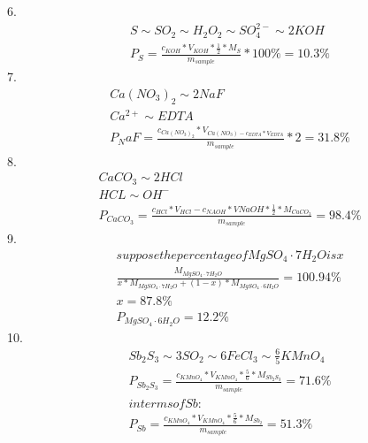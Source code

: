 \documentclass{article}
\begin{document}
6.\begin{equation}
    \begin{multlined}
        S \sim SO_2 \sim H_2O_2 \sim SO_4^{2-} \sim 2KOH\\
        P_S = \frac{c_{KOH}*V_{KOH}*\frac{1}{2}*M_S}{m_{sample}} * 100\% = 10.3\%
    \end{multlined}
\end{equation}
7.\begin{equation}
    \begin{multlined}
        Ca\left(NO_3\right)_2 \sim 2NaF\\
        Ca^{2+} \sim EDTA\\
        P_NaF = \frac{c_{Ca\left(NO_3\right)_2}*V_{Ca\left(NO_3\right) - c_{EDTA}*V_{EDTA}}}{m_{sample}} * 2 = 31.8\%
    \end{multlined}
\end{equation}
8.
\begin{equation}
    \begin{multlined}
        CaCO_3 \sim 2HCl\\
        HCL \sim OH^-\\
        P_{CaCO_3} = \frac{c_{HCl} * V_{HCl} - c_{NAOH}*V{NaOH} * \frac{1}{2} * M_{CaCO_3}}{m_{sample}} = 98.4\%
    \end{multlined}
\end{equation}
9.\begin{equation}
    \begin{multlined}
    suppose the percentage of MgSO_4\cdot7H_2O is x\\
        \frac{M_{MgSO_4\cdot7H_2O}}{x*M_{MgSO_4\cdot7H_2O} + \left(1-x\right)*M_{MgSO_4\cdot6H_2O}} = 100.94\%\\
        x = 87.8\%\\
        P_{MgSO_4\cdot6H_2O} = 12.2\%
    \end{multlined}
\end{equation}
10.\begin{equation}
    \begin{multlined}
        Sb_2S_3 \sim 3SO_2 \sim 6FeCl_3 \sim \frac{6}{5} KMnO_4\\
        P_{Sb_2S_3} = \frac{c_{KMnO_4} * V_{KMnO_4} * \frac{5}{6} * M_{Sb_2S_3}}{m_{sample}} = 71.6\%\\
        in terms of Sb:\\
        P_{Sb} = \frac{c_{KMnO_4} * V_{KMnO_4} * \frac{5}{6} * M_{Sb_2}}{m_{sample}} = 51.3\%
    \end{multlined}
\end{equation}
\end{document}
